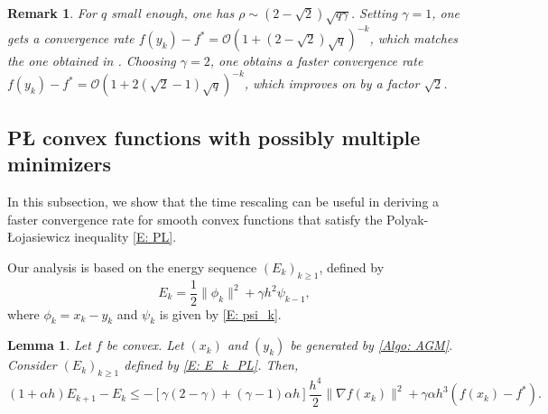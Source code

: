 \documentclass[pdflatex,sn-mathphys-num]{sn-jnl}
\theoremstyle{thmstyleone}
\newtheorem{lemma}[theorem]{Lemma}
\theoremstyle{thmstyletwo}
\newtheorem{remark}{Remark}
\theoremstyle{thmstylethree}
\begin{document}
\begin{remark}
For $q$ small enough, one has $\rho\sim (2-\sqrt{2})\sqrt{q\gamma}$. Setting $\gamma=1$, one gets a convergence rate $f(y_k)-f^*=\mathcal{O}\left( 1 + (2-\sqrt{2})\sqrt{q} \right)^{-k}$, which matches the one obtained in \cite{Aujol_2023}. Choosing $\gamma=2$, one obtains a faster convergence rate $f(y_k)-f^*=\mathcal{O}\left( 1 + 2(\sqrt{2}-1)\sqrt{q} \right)^{-k}$, which improves on \cite{Aujol_2023} by a factor $\sqrt{2}$.   
\end{remark}




\subsection{P{\L} convex functions with possibly multiple minimizers}\label{SS:Algorithms_nonunique}

In this subsection, we show that the time rescaling can be useful in deriving a faster convergence rate for smooth convex functions that satisfy the Polyak-\L ojasiewicz inequality \eqref{E: PL}.

Our analysis is based on the energy sequence $(E_k)_{k\ge 1}$, defined by
\begin{equation}\label{E: E_k_PL}
E_k = \frac{1}{2}\| \phi_k \|^2 + \gamma h^2 \psi_{k-1},
\end{equation}
where $\phi_k = x_k-y_k$ and $\psi_k$ is given by \eqref{E: psi_k}.


\begin{lemma}\label{Lem: E_k_bound_PL}
Let $f$ be convex. Let $(x_k)$ and $(y_k)$ be generated by \eqref{Algo: AGM}. Consider $(E_k)_{k\ge 1}$ defined by \eqref{E: E_k_PL}. Then, 
$$ (1+\alpha h)E_{k+1}-E_k 
\le - \left[ \gamma(2-\gamma) + (\gamma-1) \alpha h \right] \frac{h^4}{2} \| \nabla f(x_k) \|^2
    + \gamma\alpha h^3 \left( f(x_k) - f^* \right). $$
\end{lemma}
\end{document}
